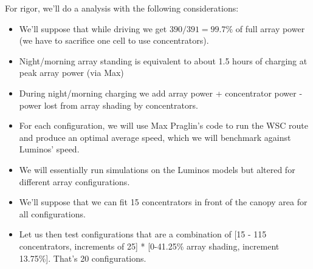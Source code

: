 \documentclass[reqno, 11pt, final]{article}
\begin{document}
For rigor, we'll do a analysis with the following considerations:
\begin{itemize}
	\item We'll suppose that while driving we get $390/391 = 99.7\%$ of full array power (we have to sacrifice one cell to use concentrators).
	\item Night/morning array standing is equivalent to about 1.5 hours of charging at peak array power (via Max)
	\item During night/morning charging we add array power + concentrator power - power lost from array shading by concentrators.
	\item For each configuration, we will use Max Praglin's code to run the WSC route and produce an optimal average speed, which we will benchmark against Luminos' speed.
	\item We will essentially run simulations on the Luminos models but altered for different array configurations.
	\item We'll suppose that we can fit 15 concentrators in front of the canopy area for all configurations.
	\item Let us then test configurations that are a combination of [15 - 115 concentrators, increments of 25] * [0-41.25\% array shading, increment 13.75\%]. That's 20 configurations.
\end{itemize}
\end{document}
